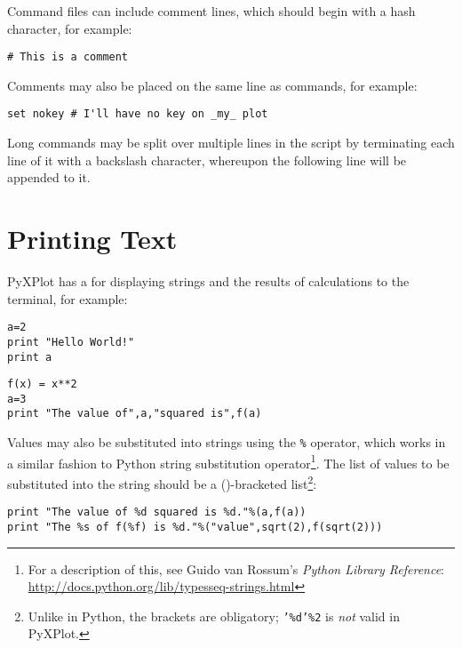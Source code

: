 Command files can include comment lines, which should begin with a hash
character, for example:

\begin{verbatim}
# This is a comment
\end{verbatim}

\noindent Comments may also be placed on the same line as commands, for
example:

\begin{verbatim}
set nokey # I'll have no key on _my_ plot
\end{verbatim}

Long commands may be split over multiple lines in the script by terminating
each line of it with a backslash character, whereupon the following line will
be appended to it.

\section{Printing Text}
\label{string_subs_op}

PyXPlot has a  for displaying strings and the results of
calculations to the terminal, for example:

\begin{verbatim}
a=2
print "Hello World!"
print a
\end{verbatim}

\begin{verbatim}
f(x) = x**2
a=3
print "The value of",a,"squared is",f(a)
\end{verbatim}

\noindent Values may also be substituted into strings using the {\tt \%}
operator, which works in a similar fashion
to Python string substitution operator\footnote{For a description of this, see Guido van
Rossum's {\it Python Library Reference}: \url{http://docs.python.org/lib/typesseq-strings.html}}.
The list of values to be substituted into the string should be a ()-bracketed
list\footnote{Unlike in Python, the brackets are obligatory; {\tt '\%d'\%2} is
{\it not} valid in PyXPlot.}:

\begin{verbatim}
print "The value of %d squared is %d."%(a,f(a))
print "The %s of f(%f) is %d."%("value",sqrt(2),f(sqrt(2)))
\end{verbatim}

